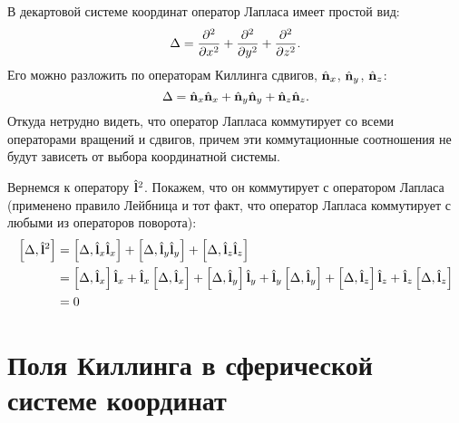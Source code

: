 \documentclass[12pt,a4paper]{article}
\begin{document}
        В декартовой системе координат оператор Лапласа имеет простой вид:
        \begin{equation}
            \Delta = \pdv[2]{x} + \pdv[2]{y} + \pdv[2]{z} .
        \end{equation}
        Его можно разложить по операторам Киллинга сдвигов, $\hat{\mathbf{n}}_x$, $\hat{\mathbf{n}}_y$, $\hat{\mathbf{n}}_z$:
        \begin{equation}
            \Delta = \hat{\mathbf{n}}_x\hat{\mathbf{n}}_x + \hat{\mathbf{n}}_y\hat{\mathbf{n}}_y + \hat{\mathbf{n}}_z\hat{\mathbf{n}}_z .
        \end{equation}
        Откуда нетрудно видеть, что оператор Лапласа коммутирует со всеми операторами вращений и сдвигов, причем эти коммутационные соотношения не будут зависеть от выбора координатной системы.

        Вернемся к оператору $\hat{\mathbf{l}}^2$. Покажем, что он коммутирует с оператором Лапласа (применено правило Лейбница и тот факт, что оператор Лапласа коммутирует с любыми из операторов поворота):
        \begin{equation}\begin{aligned}
            \left[ \Delta, \hat{\mathbf{l}}^2 \right]
                &= \left[ \Delta, \hat{\mathbf{l}}_x \hat{\mathbf{l}}_x \right]
                    + \left[ \Delta, \hat{\mathbf{l}}_y \hat{\mathbf{l}}_y \right]
                    + \left[ \Delta, \hat{\mathbf{l}}_z \hat{\mathbf{l}}_z \right] \\
                &= \left[ \Delta, \hat{\mathbf{l}}_x \right] \hat{\mathbf{l}}_x
                    + \hat{\mathbf{l}}_x \left[ \Delta, \hat{\mathbf{l}}_x \right]
                    + \left[ \Delta, \hat{\mathbf{l}}_y \right] \hat{\mathbf{l}}_y
                    + \hat{\mathbf{l}}_y \left[ \Delta, \hat{\mathbf{l}}_y \right]
                    + \left[ \Delta, \hat{\mathbf{l}}_z \right] \hat{\mathbf{l}}_z
                    + \hat{\mathbf{l}}_z \left[ \Delta, \hat{\mathbf{l}}_z \right] \\
                &= 0
        \end{aligned}\end{equation}


    \section{Поля Киллинга в сферической системе координат}
\end{document}
